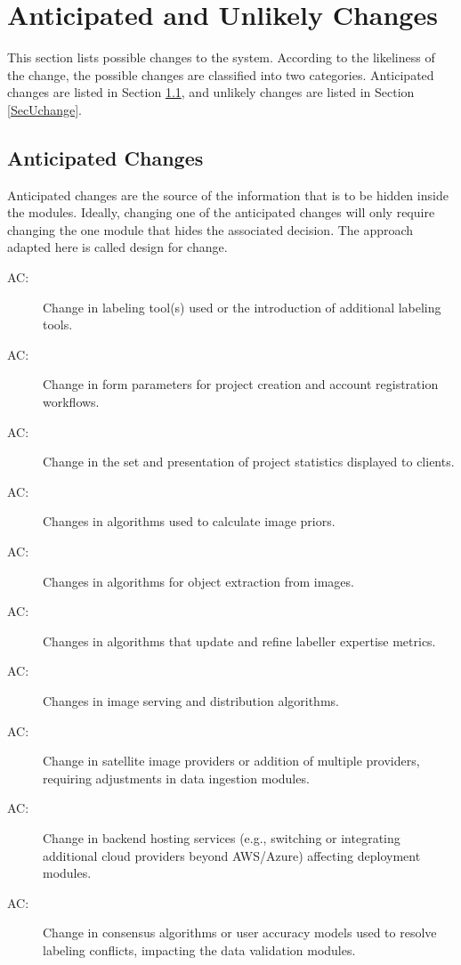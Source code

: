 \documentclass[12pt, titlepage]{article}
\newcounter{acnum}
\newcommand{\actheacnum}{AC\theacnum}
\begin{document}
\section{Anticipated and Unlikely Changes} \label{SecChange}

This section lists possible changes to the system. According to the likeliness
of the change, the possible changes are classified into two
categories. Anticipated changes are listed in Section \ref{SecAchange}, and
unlikely changes are listed in Section \ref{SecUchange}.

\subsection{Anticipated Changes} \label{SecAchange}

Anticipated changes are the source of the information that is to be hidden
inside the modules. Ideally, changing one of the anticipated changes will only
require changing the one module that hides the associated decision. The approach
adapted here is called design for
change.

\begin{description}
  \item[ \actheacnum \label{acHardware}:] Change in labeling tool(s) used or the introduction of additional labeling tools.
  \item[ \actheacnum \label{acInput}:] Change in form parameters for project creation and account registration workflows.
  \item[ \actheacnum \label{acPresentation}:] Change in the set and presentation of project statistics displayed to clients.
  \item[ \actheacnum \label{acImagePriors}:] Changes in algorithms used to calculate image priors.
  \item[ \actheacnum \label{acObjectExtr}:] Changes in algorithms for object extraction from images.
  \item[ \actheacnum \label{acExpertLabel}:] Changes in algorithms that update and refine labeller expertise metrics.
  \item[ \actheacnum \label{acImageServe}:] Changes in image serving and distribution algorithms.
  \item[ \actheacnum \label{acImageProvider}:] Change in satellite image providers or addition of multiple providers, requiring adjustments in data ingestion modules.
  \item[ \actheacnum \label{acCloud}:] Change in backend hosting services (e.g., switching or integrating additional cloud providers beyond AWS/Azure) affecting deployment modules.
  \item[ \actheacnum \label{acConsensus}:] Change in consensus algorithms or user accuracy models used to resolve labeling conflicts, impacting the data validation modules.
\end{description}
\end{document}
